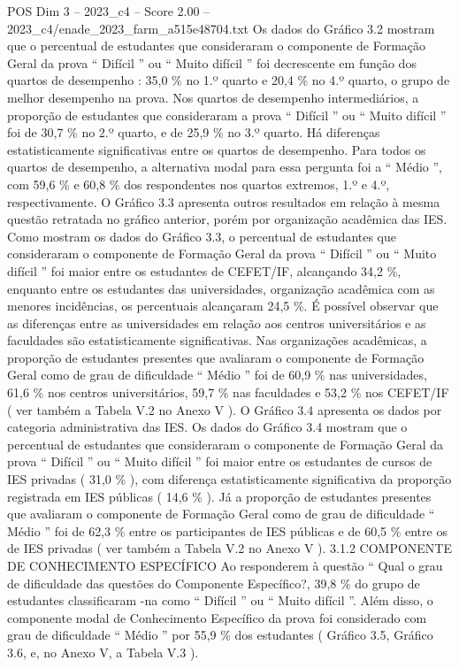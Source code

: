 \begin{textsample}{POS Dim 3 – 2023\_c4 – Score 2.00 – 2023\_c4/enade\_2023\_farm\_a515e48704.txt}
Os dados do Gráfico 3.2 mostram que o percentual de estudantes que consideraram o componente de Formação Geral da prova “ Difícil ” ou “ Muito difícil ” foi decrescente em função dos quartos de desempenho : 35,0 \% no 1.º quarto e 20,4 \% no 4.º quarto, o grupo de melhor desempenho na prova.
Nos quartos de desempenho intermediários, a proporção de estudantes que consideraram a prova “ Difícil ” ou “ Muito difícil ” foi de 30,7 \% no 2.º quarto, e de 25,9 \% no 3.º quarto.
Há diferenças estatisticamente significativas entre os quartos de desempenho.
Para todos os quartos de desempenho, a alternativa modal para essa pergunta foi a “ Médio ”, com 59,6 \% e 60,8 \% dos respondentes nos quartos extremos, 1.º e 4.º, respectivamente.
O Gráfico 3.3 apresenta outros resultados em relação à mesma questão retratada no gráfico anterior, porém por organização acadêmica das IES.
Como mostram os dados do Gráfico 3.3, o percentual de estudantes que consideraram o componente de Formação Geral da prova “ Difícil ” ou “ Muito difícil ” foi maior entre os estudantes de CEFET/IF, alcançando 34,2 \%, enquanto entre os estudantes das universidades, organização acadêmica com as menores incidências, os percentuais alcançaram 24,5 \%.
É possível observar que as diferenças entre as universidades em relação aos centros universitários e as faculdades são estatisticamente significativas.
Nas organizações acadêmicas, a proporção de estudantes presentes que avaliaram o componente de Formação Geral como de grau de dificuldade “ Médio ” foi de 60,9 \% nas universidades, 61,6 \% nos centros universitários, 59,7 \% nas faculdades e 53,2 \% nos CEFET/IF ( ver também a Tabela V.2 no Anexo V ).
O Gráfico 3.4 apresenta os dados por categoria administrativa das IES.
Os dados do Gráfico 3.4 mostram que o percentual de estudantes que consideraram o componente de Formação Geral da prova “ Difícil ” ou “ Muito difícil ” foi maior entre os estudantes de cursos de IES privadas ( 31,0 \% ), com diferença estatisticamente significativa da proporção registrada em IES públicas ( 14,6 \% ).
Já a proporção de estudantes presentes que avaliaram o componente de Formação Geral como de grau de dificuldade “ Médio ” foi de 62,3 \% entre os participantes de IES públicas e de 60,5 \% entre os de IES privadas ( ver também a Tabela V.2 no Anexo V ). 3.1.2 COMPONENTE DE CONHECIMENTO ESPECÍFICO Ao responderem à questão “ Qual o grau de dificuldade das questões do Componente Específico?, 39,8 \% do grupo de estudantes classificaram -na como “ Difícil ” ou “ Muito difícil ”.
Além disso, o componente modal de Conhecimento Específico da prova foi considerado com grau de dificuldade “ Médio ” por 55,9 \% dos estudantes ( Gráfico 3.5, Gráfico 3.6, e, no Anexo V, a Tabela V.3 ).

\end{textsample}
